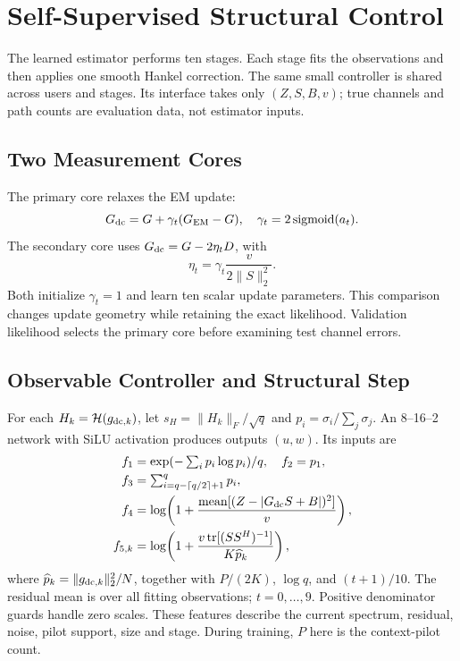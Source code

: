 \documentclass[10pt,journal,letterpaper]{IEEEtran}
\newcommand{\HH}{\mathcal{H}}
\DeclareMathOperator{\tr}{tr}
\DeclareMathOperator{\sigmoid}{sigmoid}
\begin{document}
\section{Self-Supervised Structural Control}
\label{sec:learned}
The learned estimator performs ten stages. Each stage fits the observations and then applies one smooth Hankel correction. The same small controller is shared across users and stages. Its interface takes only $(Z,S,B,v)$; true channels and path counts are evaluation data, not estimator inputs.

\subsection{Two Measurement Cores}
The primary core relaxes the EM update:
\begin{equation}
 G_{\rm dc}=G+\gamma_t(G_{\rm EM}-G),\quad
 \gamma_t=2\sigmoid(a_t).
\end{equation}
The secondary core uses $G_{\rm dc}=G-2\eta_tD$, with
\begin{equation}
 \eta_t=\gamma_t\frac{v}{2\|S\|_2^2}.
\end{equation}
Both initialize $\gamma_t=1$ and learn ten scalar update parameters. This comparison changes update geometry while retaining the exact likelihood. Validation likelihood selects the primary core before examining test channel errors.

\subsection{Observable Controller and Structural Step}
For each $H_k=\HH(g_{{\rm dc},k})$, let $s_H=\|H_k\|_F/\sqrt q$ and $p_i=\sigma_i/\sum_j\sigma_j$. An 8--16--2 network with SiLU activation produces outputs $(u,w)$. Its inputs are
\begin{align}
 f_1&=\exp(-\textstyle\sum_i p_i\log p_i)/q,\quad f_2=p_1,\nonumber\\
 f_3&=\textstyle\sum_{i=q-\lceil q/2\rceil+1}^q p_i,\label{eq:features}\\
 f_4&=\log\!\left(1+\frac{\operatorname{mean}[(Z-|G_{\rm dc}S+B|)^2]}{v}\right),\nonumber\\
 f_{5,k}&=\log\!\left(1+\frac{v\tr[(SS^H)^{-1}]}{K\widehat p_k}\right),\nonumber
\end{align}
where $\widehat p_k=\|g_{{\rm dc},k}\|_2^2/N$, together with $P/(2K)$, $\log q$, and $(t+1)/10$. The residual mean is over all fitting observations; $t=0,\ldots,9$. Positive denominator guards handle zero scales. These features describe the current spectrum, residual, noise, pilot support, size and stage. During training, $P$ here is the context-pilot count.
\end{document}
